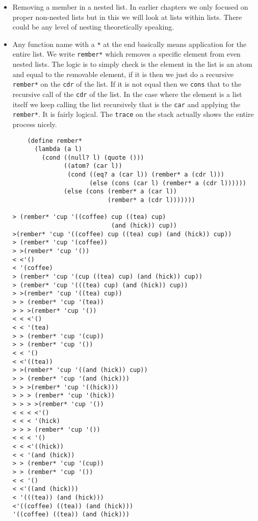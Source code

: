 \documentclass[11pt]{article}
\begin{document}
\vspace{1em}

\begin{itemize}
\item Removing a member in a nested list. In earlier chapters we only focused on proper non-nested lists but in this we will look at lists within lists. There could
be any level of nesting theoretically speaking.
\item Any function name with a \texttt{*} at the end basically means application for the entire list. We write \texttt{rember*} which removes a specific element from even nested lists.
The logic is to simply check is the element in the list is an atom and equal to the removable element, if it is then we just do a recursive \texttt{rember*} on the \texttt{cdr} of the list. If it is not equal
then we \texttt{cons} that to the recursive call of the \texttt{cdr} of the list. In the case where the element is a list itself we keep calling the list recursively that is the \texttt{car} and applying the \texttt{rember*}.
It is fairly logical. The \texttt{trace} on the stack actually shows the entire process nicely.
\begin{verbatim}
    (define rember*
      (lambda (a l)
        (cond ((null? l) (quote ()))
              ((atom? (car l))
               (cond ((eq? a (car l)) (rember* a (cdr l)))
                     (else (cons (car l) (rember* a (cdr l))))))
              (else (cons (rember* a (car l))
                          (rember* a (cdr l)))))))

> (rember* 'cup '((coffee) cup ((tea) cup)
                           (and (hick)) cup))
>(rember* 'cup '((coffee) cup ((tea) cup) (and (hick)) cup))
> (rember* 'cup '(coffee))
> >(rember* 'cup '())
< <'()
< '(coffee)
> (rember* 'cup '(cup ((tea) cup) (and (hick)) cup))
> (rember* 'cup '(((tea) cup) (and (hick)) cup))
> >(rember* 'cup '((tea) cup))
> > (rember* 'cup '(tea))
> > >(rember* 'cup '())
< < <'()
< < '(tea)
> > (rember* 'cup '(cup))
> > (rember* 'cup '())
< < '()
< <'((tea))
> >(rember* 'cup '((and (hick)) cup))
> > (rember* 'cup '(and (hick)))
> > >(rember* 'cup '((hick)))
> > > (rember* 'cup '(hick))
> > > >(rember* 'cup '())
< < < <'()
< < < '(hick)
> > > (rember* 'cup '())
< < < '()
< < <'((hick))
< < '(and (hick))
> > (rember* 'cup '(cup))
> > (rember* 'cup '())
< < '()
< <'((and (hick)))
< '(((tea)) (and (hick)))
<'((coffee) ((tea)) (and (hick)))
'((coffee) ((tea)) (and (hick)))

\end{verbatim}
\end{itemize}
\end{document}
